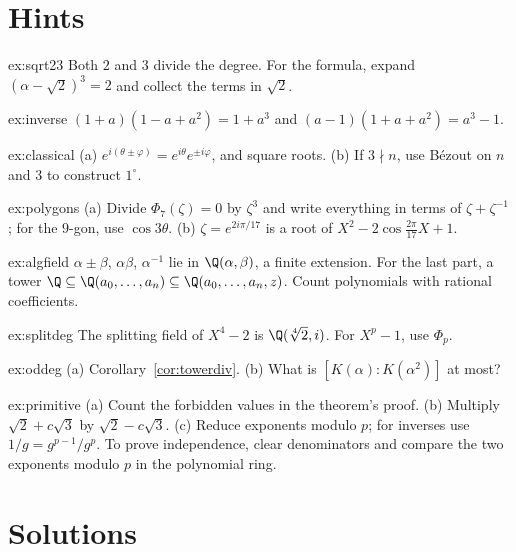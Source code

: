 \section{Hints}

\begin{hint}{ex:sqrt23}
Both $2$ and $3$ divide the degree. For the formula, expand $(\alpha-\sqrt2)^3=2$ and collect the terms in $\sqrt2$.
\end{hint}
\begin{hint}{ex:inverse}
$(1+a)(1-a+a^2)=1+a^3$ and $(a-1)(1+a+a^2)=a^3-1$.
\end{hint}
\begin{hint}{ex:classical}
(a) $e^{i(\theta\pm\varphi)}=e^{i\theta}e^{\pm i\varphi}$, and square roots. (b) If $3\nmid n$, use Bézout on $n$ and $3$ to construct $1^\circ$.
\end{hint}
\begin{hint}{ex:polygons}
(a) Divide $\Phi_7(\zeta)=0$ by $\zeta^3$ and write everything in terms of $\zeta+\zeta^{-1}$; for the $9$-gon, use $\cos3\theta$. (b) $\zeta=e^{2i\pi/17}$ is a root of $X^2-2\cos\frac{2\pi}{17}X+1$.
\end{hint}
\begin{hint}{ex:algfield}
$\alpha\pm\beta$, $\alpha\beta$, $\alpha^{-1}$ lie in $\Q(\alpha,\beta)$, a finite extension. For the last part, a tower $\Q\subseteq\Q(a_0,\dots,a_n)\subseteq\Q(a_0,\dots,a_n,z)$. Count polynomials with rational coefficients.
\end{hint}
\begin{hint}{ex:splitdeg}
The splitting field of $X^4-2$ is $\Q(\sqrt[4]2,i)$. For $X^p-1$, use $\Phi_p$.
\end{hint}
\begin{hint}{ex:oddeg}
(a) Corollary~\ref{cor:towerdiv}. (b) What is $[K(\alpha):K(\alpha^2)]$ at most?
\end{hint}
\begin{hint}{ex:primitive}
(a) Count the forbidden values in the theorem's proof. (b) Multiply
$\sqrt2+c\sqrt3$ by $\sqrt2-c\sqrt3$. (c) Reduce exponents modulo $p$;
for inverses use $1/g=g^{p-1}/g^p$. To prove independence, clear denominators
and compare the two exponents modulo $p$ in the polynomial ring.
\end{hint}

\section{Solutions}

